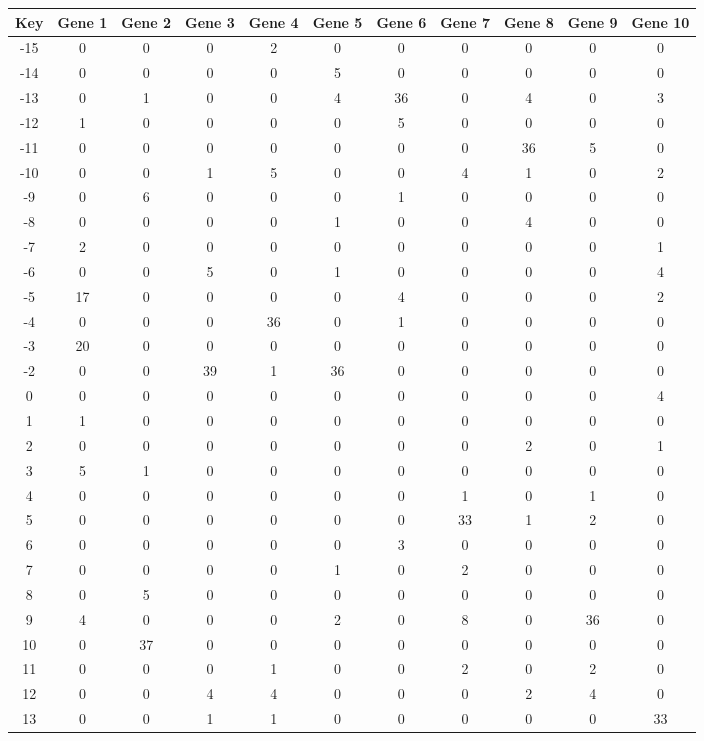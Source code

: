 \begin{tabular}{|c|c|c|c|c|c|c|c|c|c|c|}
\hline
Key & Gene 1 & Gene 2 & Gene 3 & Gene 4 & Gene 5 & Gene 6 & Gene 7 & Gene 8 & Gene 9 & Gene 10 \\
\hline
-15 & 0 & 0 & 0 & 2 & 0 & 0 & 0 & 0 & 0 & 0 \\
-14 & 0 & 0 & 0 & 0 & 5 & 0 & 0 & 0 & 0 & 0 \\
-13 & 0 & 1 & 0 & 0 & 4 & 36 & 0 & 4 & 0 & 3 \\
-12 & 1 & 0 & 0 & 0 & 0 & 5 & 0 & 0 & 0 & 0 \\
-11 & 0 & 0 & 0 & 0 & 0 & 0 & 0 & 36 & 5 & 0 \\
-10 & 0 & 0 & 1 & 5 & 0 & 0 & 4 & 1 & 0 & 2 \\
-9 & 0 & 6 & 0 & 0 & 0 & 1 & 0 & 0 & 0 & 0 \\
-8 & 0 & 0 & 0 & 0 & 1 & 0 & 0 & 4 & 0 & 0 \\
-7 & 2 & 0 & 0 & 0 & 0 & 0 & 0 & 0 & 0 & 1 \\
-6 & 0 & 0 & 5 & 0 & 1 & 0 & 0 & 0 & 0 & 4 \\
-5 & 17 & 0 & 0 & 0 & 0 & 4 & 0 & 0 & 0 & 2 \\
-4 & 0 & 0 & 0 & 36 & 0 & 1 & 0 & 0 & 0 & 0 \\
-3 & 20 & 0 & 0 & 0 & 0 & 0 & 0 & 0 & 0 & 0 \\
-2 & 0 & 0 & 39 & 1 & 36 & 0 & 0 & 0 & 0 & 0 \\
0 & 0 & 0 & 0 & 0 & 0 & 0 & 0 & 0 & 0 & 4 \\
1 & 1 & 0 & 0 & 0 & 0 & 0 & 0 & 0 & 0 & 0 \\
2 & 0 & 0 & 0 & 0 & 0 & 0 & 0 & 2 & 0 & 1 \\
3 & 5 & 1 & 0 & 0 & 0 & 0 & 0 & 0 & 0 & 0 \\
4 & 0 & 0 & 0 & 0 & 0 & 0 & 1 & 0 & 1 & 0 \\
5 & 0 & 0 & 0 & 0 & 0 & 0 & 33 & 1 & 2 & 0 \\
6 & 0 & 0 & 0 & 0 & 0 & 3 & 0 & 0 & 0 & 0 \\
7 & 0 & 0 & 0 & 0 & 1 & 0 & 2 & 0 & 0 & 0 \\
8 & 0 & 5 & 0 & 0 & 0 & 0 & 0 & 0 & 0 & 0 \\
9 & 4 & 0 & 0 & 0 & 2 & 0 & 8 & 0 & 36 & 0 \\
10 & 0 & 37 & 0 & 0 & 0 & 0 & 0 & 0 & 0 & 0 \\
11 & 0 & 0 & 0 & 1 & 0 & 0 & 2 & 0 & 2 & 0 \\
12 & 0 & 0 & 4 & 4 & 0 & 0 & 0 & 2 & 4 & 0 \\
13 & 0 & 0 & 1 & 1 & 0 & 0 & 0 & 0 & 0 & 33 \\
\hline
\end{tabular}